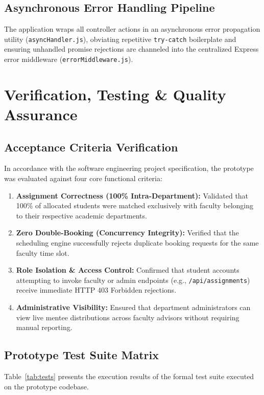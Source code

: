 \documentclass[11pt,a4paper]{article}
\begin{document}
\subsection{Asynchronous Error Handling Pipeline}
The application wraps all controller actions in an asynchronous error propagation utility (\texttt{asyncHandler.js}), obviating repetitive \texttt{try-catch} boilerplate and ensuring unhandled promise rejections are channeled into the centralized Express error middleware (\texttt{errorMiddleware.js}).

\section{Verification, Testing \& Quality Assurance}

\subsection{Acceptance Criteria Verification}
In accordance with the software engineering project specification, the prototype was evaluated against four core functional criteria:
\begin{enumerate}[leftmargin=1.4em, itemsep=0.2em]
  \item \textbf{Assignment Correctness (100\% Intra-Department):} Validated that 100\% of allocated students were matched exclusively with faculty belonging to their respective academic departments.
  \item \textbf{Zero Double-Booking (Concurrency Integrity):} Verified that the scheduling engine successfully rejects duplicate booking requests for the same faculty time slot.
  \item \textbf{Role Isolation \& Access Control:} Confirmed that student accounts attempting to invoke faculty or admin endpoints (e.g., \texttt{/api/assignments}) receive immediate HTTP 403 Forbidden rejections.
  \item \textbf{Administrative Visibility:} Ensured that department administrators can view live mentee distributions across faculty advisors without requiring manual reporting.
\end{enumerate}

\subsection{Prototype Test Suite Matrix}
Table~\ref{tab:tests} presents the execution results of the formal test suite executed on the prototype codebase.
\end{document}
